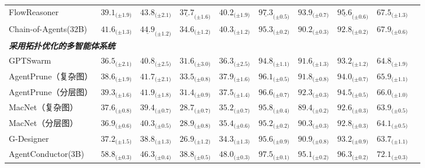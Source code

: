 \documentclass{article}
\theoremstyle{definition}
\begin{document}
\begin{table}[!t]
{\begin{tabular}{p{5cm}*{8}{c}c}
FlowReasoner 
& $39.1_{\text{(±1.9)}}$
& $43.8_{\text{(±2.1)}}$
& $\underline{37.7}_{\text{(±1.6)}}$
& $40.2_{\text{(±1.9)}}$
& $\underline{97.3}_{\text{(±0.5)}}$
& $93.9_{\text{(±0.7)}}$
& $\underline{95.6}_{\text{(±0.6)}}$
& $67.5_{\text{(±1.3)}}$\\

Chain-of-Agents(32B) 
& $41.6_{\text{(±1.3)}}$
& $\underline{44.9}_{\text{(±1.2)}}$
& $34.6_{\text{(±1.2)}}$
& $40.3_{\text{(±1.2)}}$
& $95.3_{\text{(±0.2)}}$
& $90.2_{\text{(±0.3)}}$
& $92.8_{\text{(±0.2)}}$
& $67.9_{\text{(±0.6)}}$\\

\midrule
\multicolumn{9}{l}{\textit{\textbf{采用拓扑优化的多智能体系统}}} \\

GPTSwarm 
& $36.5_{\text{(±2.1)}}$
& $40.8_{\text{(±2.5)}}$
& $31.6_{\text{(±3.0)}}$
& $36.3_{\text{(±2.5)}}$
& $94.8_{\text{(±1.1)}}$
& $91.6_{\text{(±1.3)}}$
& $93.2_{\text{(±1.2)}}$
& $64.8_{\text{(±1.9)}}$\\

AgentPrune（复杂图）
& $38.6_{\text{(±1.9)}}$
& $41.7_{\text{(±2.1)}}$
& $33.5_{\text{(±0.8)}}$
& $37.9_{\text{(±1.6)}}$
& $96.1_{\text{(±0.5)}}$
& $91.8_{\text{(±0.8)}}$
& $94.0_{\text{(±0.7)}}$
& $65.9_{\text{(±1.1)}}$\\

AgentPrune（分层图）
& $39.3_{\text{(±1.6)}}$
& $41.9_{\text{(±1.8)}}$
& $31.4_{\text{(±0.9)}}$
& $37.5_{\text{(±1.4)}}$
& $96.6_{\text{(±0.7)}}$
& $92.3_{\text{(±0.3)}}$
& $94.5_{\text{(±0.5)}}$
& $66.0_{\text{(±1.0)}}$\\

MacNet（复杂图）
& $37.6_{\text{(±0.8)}}$
& $39.4_{\text{(±0.7)}}$
& $28.7_{\text{(±0.7)}}$
& $35.2_{\text{(±0.7)}}$
& $95.8_{\text{(±0.4)}}$
& $89.4_{\text{(±0.2)}}$
& $92.6_{\text{(±0.3)}}$
& $63.9_{\text{(±0.5)}}$\\

MacNet（分层图）
& $36.9_{\text{(±0.6)}}$
& $40.3_{\text{(±0.5)}}$
& $28.9_{\text{(±0.8)}}$
& $35.4_{\text{(±0.6)}}$
& $95.2_{\text{(±0.2)}}$
& $90.3_{\text{(±0.3)}}$
& $92.8_{\text{(±0.3)}}$
& $64.1_{\text{(±0.5)}}$\\

G-Designer 
& $37.2_{\text{(±1.5)}}$
& $38.8_{\text{(±1.3)}}$
& $26.9_{\text{(±1.2)}}$
& $34.3_{\text{(±1.3)}}$
& $95.6_{\text{(±0.9)}}$
& $90.9_{\text{(±0.8)}}$
& $93.2_{\text{(±0.9)}}$
& $63.7_{\text{(±1.1)}}$\\

\rowcolor[RGB]{220,235,245}
AgentConductor(3B)  
& $\mathbf{58.8}_{\text{(±0.3)}}$
& $\mathbf{46.3}_{\text{(±0.4)}}$
& $\mathbf{38.8}_{\text{(±0.5)}}$
& $\mathbf{48.0}_{\text{(±0.3)}}$
& $\mathbf{97.5}_{\text{(±0.1)}}$
& $\mathbf{95.1}_{\text{(±0.2)}}$
& $\mathbf{96.3}_{\text{(±0.2)}}$
& $\mathbf{72.1}_{\text{(±0.3)}}$\\

\bottomrule
\end{tabular}}
\vspace{-0.8em}
\end{table}
\end{document}
